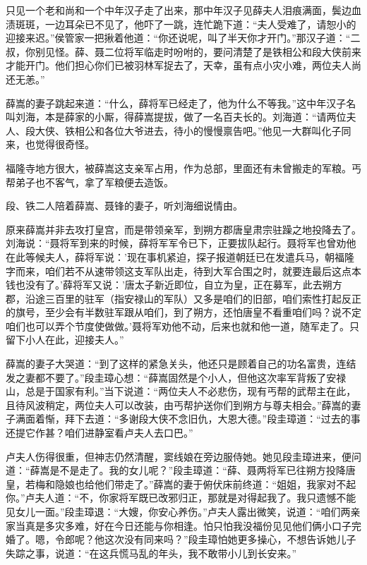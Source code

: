 \documentclass[12pt,oneside]{book}
\begin{document}
只见一个老和尚和一个中年汉子走了出来，那中年汉子见薛夫人泪痕满面，鬓边血渍斑斑，一边耳朵已不见了，他吓了一跳，连忙跪下道：``夫人受难了，请恕小的迎接来迟。''侯管家一把揪着他道：``你还说呢，叫了半天你才开门。''那汉子道：``二叔，你别见怪。薛、聂二位将军临走时吩咐的，要问清楚了是铁相公和段大侠前来才能开门。他们担心你们已被羽林军捉去了，天幸，虽有点小灾小难，两位夫人尚还无恙。''

薛嵩的妻子跳起来道：``什么，薛将军已经走了，他为什么不等我。''这中年汉子名叫刘海，本是薛家的小厮，得薛嵩提拔，做了一名百夫长的。刘海道：``请两位夫人、段大侠、铁相公和各位大爷进去，待小的慢慢禀告吧。''他见一大群叫化子同来，也觉得很奇怪。

福隆寺地方很大，被薛嵩这支亲军占用，作为总部，里面还有未曾搬走的军粮。丐帮弟子也不客气，拿了军粮便去造饭。

段、铁二人陪着薛嵩、聂锋的妻子，听刘海细说情由。

原来薛嵩并非去攻打皇宫，而是带领亲军，到朔方郡唐皇肃宗驻躁之地投降去了。刘海说：``聂将军到来的时候，薛将军军令已下，正要拔队起行。聂将军也曾劝他在此等候夫人，薛将军说：'现在事机紧迫，探子报道朝廷已在发遣兵马，朝福隆字而来，咱们若不从速带领这支军队出走，待到大军合围之时，就要连最后这点本钱也没有了。'薛将军又说：'唐太子新近即位，自立为皇，正在募军，此去朔方郡，沿途三百里的驻军（指安禄山的军队）又多是咱们的旧部，咱们索性打起反正的旗号，至少会有半数驻军跟从咱们，到了朔方，还怕唐皇不看重咱们吗？说不定咱们也可以弄个节度使做做。'聂将军劝他不动，后来也就和他一道，随军走了。只留下小人在此，迎接夫人。''

薛嵩的妻子大哭道：``到了这样的紧急关头，他还只是顾着自己的功名富贵，连结发之妻都不要了。''段圭璋心想：``薛嵩固然是个小人，但他这次率军背叛了安禄山，总是于国家有利。''当下说道：``两位夫人不必悲伤，现有丐帮的武帮主在此，且待风波稍定，两位夫人可以改装，由丐帮护送你们到朔方与尊夫相会。''薛嵩的妻子满面着惭，拜下去道：``多谢段大侠不念旧仇，大恩大德。''段圭璋道：``过去的事还提它作甚？咱们进静室看卢夫人去口巴。''

卢夫人伤得很重，但神志仍然清醒，窦线娘在旁边服侍她。她见段圭璋进来，便问道：``薛嵩是不是走了。我的女儿呢？''段圭璋道：``薛、聂两将军已往朔方投降唐皇，若梅和隐娘也给他们带走了。''薛嵩的妻于俯伏床前终道：``姐姐，我家对不起你。''卢夫人道：``不，你家将军既已改邪归正，那就是对得起我了。我只遗憾不能见女儿一面。''段圭璋退：``大嫂，你安心养伤。''卢夫人露出微笑，说道：``咱们两亲家当真是多灾多难，好在今日还能与你相逢。怕只怕我没福份见见他们俩小口子完婚了。嗯，令郎呢？他这次没有同来吗？''段圭璋怕她更多操心，不想告诉她儿子失踪之事，说道：``在这兵慌马乱的年头，我不敢带小儿到长安来。''
\end{document}
